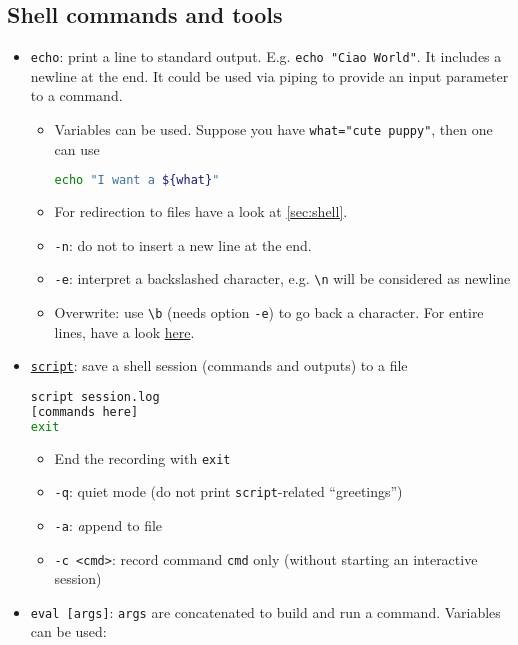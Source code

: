 \documentclass[a4paper,12pt,%
              final%
              ]{article}
\begin{document}
\subsection{Shell commands and tools}
\label{ssec:shell_tools}
\begin{itemize}
  \item \texttt{echo}: print a line to standard output. E.g. \verb|echo "Ciao World"|. It includes a newline at the end. It could be used via piping to provide an input parameter to a command.
    \begin{itemize}
      \item Variables can be used. Suppose you have \verb|what="cute puppy"|, then one can use
\begin{lstlisting}[language=bash]
echo "I want a ${what}"
\end{lstlisting}
      \item For redirection to files have a look at \autoref{sec:shell}.
      \item \verb|-n|: do not to insert a new line at the end.
      \item \verb|-e|: interpret a backslashed character, e.g. \verb|\n| will be considered as newline
      \item Overwrite: use \verb|\b| (needs option \verb|-e|) to go back a character. For entire lines, have a look \href{https://stackoverflow.com/questions/11283625/overwrite-last-line-on-terminal}{here}.
    \end{itemize}
  \item \href{https://man7.org/linux/man-pages/man1/script.1.html}{\texttt{script}}: save a shell session (commands and outputs) to a file
\begin{lstlisting}[language=bash]
script session.log
[commands here]
exit
\end{lstlisting}
    \begin{itemize}
      \item End the recording with \texttt{exit}
      \item \verb|-q|: quiet mode (do not print \texttt{script}-related ``greetings'')
      \item \verb|-a|: \emph{a}ppend to file
      \item \verb|-c <cmd>|: record command \verb|cmd| only (without starting an interactive session)
    \end{itemize}
  \item \verb|eval [args]|: \verb|args| are concatenated to build and run a command. Variables can be used:
\begin{lstlisting}[language=bash]

\end{lstlisting}
\end{itemize}
\end{document}
